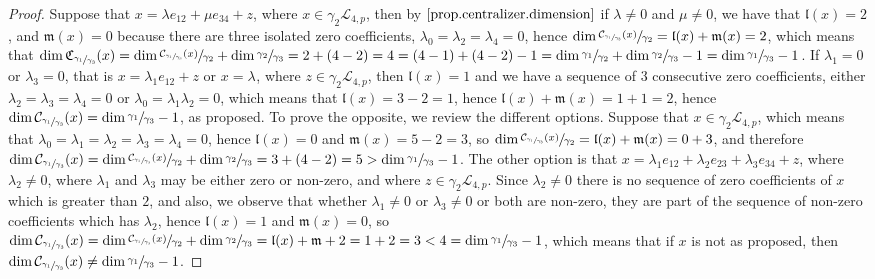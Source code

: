 \documentclass[12pt]{article}
\begin{document}
\begin{proof}
Suppose that $x=\lambda e_{12}+\mu e_{34}+z$, where $x\in\gamma_2\mathcal{L}_{4,p}$, then by $\ref{prop.centralizer.dimension}$ if $\lambda\neq 0$ and $\mu\neq 0$, we have that $\mathfrak{l}(x)=2$, and $\mathfrak{m}(x)=0$ because there are three isolated zero coefficients, $\lambda_0=\lambda_2=\lambda_4=0$, hence $\dim\sfrac{\mathcal{C}_{\sfrac{\gamma_1}{\gamma_3}}(x)}{\gamma_2}=\mathfrak{l}(x)+\mathfrak{m}(x)=2$, which means that $\dim\mathfrak{C}_{\sfrac{\gamma_1}{\gamma_3}}(x)=\dim\sfrac{\mathcal{C}_{\sfrac{\gamma_1}{\gamma_3}}(x)}{\gamma_2}+\dim\sfrac{\gamma_2}{\gamma_3}=2+(4-2)=4=(4-1)+(4-2)-1=\dim\sfrac{\gamma_1}{\gamma_2}+\dim\sfrac{\gamma_2}{\gamma_3}-1=\dim\sfrac{\gamma_1}{\gamma_3}-1$. If $\lambda_1=0$ or $\lambda_3=0$, that is $x=\lambda_1 e_{12}+z$ or $x=\lambda_{}$, where $z\in\gamma_2\mathcal{L}_{4,p}$, then $\mathfrak{l}(x)=1$ and we have a sequence of $3$ consecutive zero coefficients, either $\lambda_2=\lambda_3=\lambda_4=0$ or $\lambda_0=\lambda_1\lambda_2=0$, which means that $\mathfrak{l}(x)=3-2=1$, hence $\mathfrak{l}(x)+\mathfrak{m}(x)=1+1=2$, hence $\dim\mathcal{C}_{\sfrac{\gamma_1}{\gamma_3}}(x)=\dim\sfrac{\gamma_1}{\gamma_3}-1$, as proposed. To prove the opposite, we review the different options. Suppose that $x\in\gamma_2\mathcal{L}_{4,p}$, which means that $\lambda_0=\lambda_1=\lambda_2=\lambda_3=\lambda_4=0$, hence $\mathfrak{l}(x)=0$ and $\mathfrak{m}(x)=5-2=3$, so $\dim\sfrac{\mathcal{C}_{\sfrac{\gamma_1}{\gamma_3}}(x)}{\gamma_2}=\mathfrak{l}(x)+\mathfrak{m}(x)=0+3$, and therefore $\dim\mathcal{C}_{\sfrac{\gamma_1}{\gamma_3}}(x)=\dim\sfrac{\mathcal{C}_{\sfrac{\gamma_1}{\gamma_3}}(x)}{\gamma_2}+\dim\sfrac{\gamma_2}{\gamma_3}=3+(4-2)=5>\dim\sfrac{\gamma_1}{\gamma_3}-1$. The other option is that $x=\lambda_1 e_{12}+\lambda_2 e_{23}+\lambda_3 e_{34}+z$, where $\lambda_2\neq 0$, where $\lambda_1$ and $\lambda_3$ may be either zero or non-zero, and where $z\in\gamma_2\mathcal{L}_{4,p}$. Since $\lambda_2\neq 0$ there is no sequence of zero coefficients of $x$ which is greater than $2$, and also, we observe that whether $\lambda_1\neq 0$ or $\lambda_3\neq 0$ or both are non-zero, they are part of the sequence of non-zero coefficients which has $\lambda_2$, hence $\mathfrak{l}(x)=1$ and $\mathfrak{m}(x)=0$, so $\dim\mathcal{C}_{\sfrac{\gamma_1}{\gamma_3}}(x)=\dim\sfrac{\mathcal{C}_{\sfrac{\gamma_1}{\gamma_3}}(x)}{\gamma_2}+\dim\sfrac{\gamma_2}{\gamma_3}=\mathfrak{l}(x)+\mathfrak{m}+2=1+2=3<4=\dim\sfrac{\gamma_1}{\gamma_3}-1$, which means that if $x$ is not as proposed, then $\dim\mathcal{C}_{\sfrac{\gamma_1}{\gamma_3}}(x)\neq\dim\sfrac{\gamma_1}{\gamma_3}-1$.
\end{proof}
\end{document}
